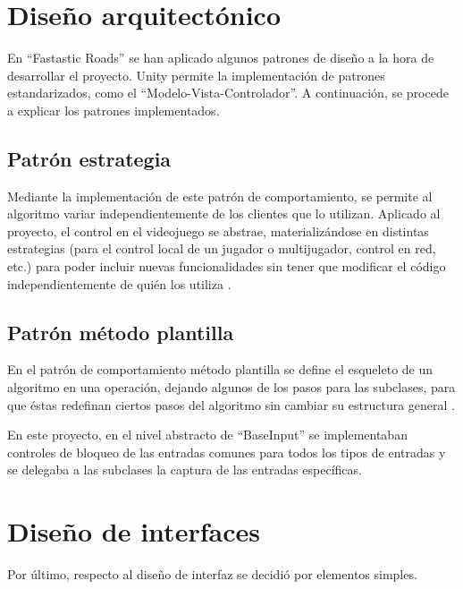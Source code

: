 \section{Diseño arquitectónico}

En ``Fastastic Roads'' se han aplicado algunos patrones de diseño a la hora de desarrollar el proyecto. Unity permite la implementación de patrones estandarizados, como el ``Modelo-Vista-Controlador''. A continuación, se procede a explicar los patrones implementados.

\subsection{Patrón estrategia}

Mediante la implementación de este patrón de comportamiento, se permite al algoritmo variar independientemente de los clientes que lo utilizan. Aplicado al proyecto, el control en el videojuego se abstrae, materializándose en distintas estrategias (para el control local de un jugador o multijugador, control en red, etc.) para poder incluir nuevas funcionalidades sin tener que modificar el código independientemente de quién los utiliza \cite{disman:estrat}.


\subsection{Patrón método plantilla}

En el patrón de comportamiento método plantilla se define el esqueleto de un algoritmo en una operación, dejando algunos de los pasos para las subclases, para que éstas redefinan ciertos pasos del algoritmo sin cambiar su estructura general \cite{disman:metplan}.

En este proyecto, en el nivel abstracto de ``BaseInput'' se implementaban controles de bloqueo de las entradas comunes para todos los tipos de entradas y se delegaba a las subclases la captura de las entradas específicas. 


\section{Diseño de interfaces}

Por último, respecto al diseño de interfaz se decidió por elementos simples.

